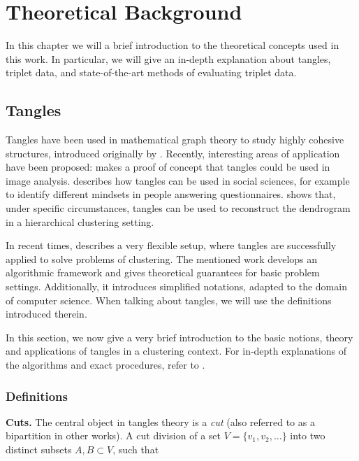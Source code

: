 \chapter{Theoretical Background}\label{theory}
In this chapter we will a brief introduction to the theoretical concepts used in this work. 
In particular, we will give an in-depth explanation about tangles, triplet data, and state-of-the-art methods of evaluating triplet data.

\section{Tangles}\label{theory:tangles}
Tangles have been used in mathematical graph theory to study highly cohesive structures, 
introduced originally by \cite{robertsonGraphMinorsObstructions1991}. 
Recently, interesting areas of application have been proposed:
\cite{diestelTanglesMonaLisa2017} makes a proof of concept that tangles could 
be used in image analysis.
\cite{diestelTanglesSocialSciences2019} describes how tangles can be used in social sciences, for 
example to identify different mindsets in people answering questionnaires.
\citep{fluckTanglesSingleLinkage2019} shows that, under specific circumstances, tangles can be
used to reconstruct the dendrogram in a hierarchical clustering setting. 

In recent times, \cite{klepperClusteringTanglesAlgorithmic2021} describes a very flexible setup,
where tangles are successfully applied to solve problems of clustering. 
The mentioned work develops an algorithmic framework and gives theoretical guarantees for 
basic problem settings.
Additionally, it introduces simplified notations, adapted to the domain of computer science. 
When talking about tangles, we will use the definitions introduced therein. 

In this section, we now give a very brief introduction to the basic notions, theory and applications of tangles in a clustering context.
For in-depth explanations of the algorithms and exact procedures, refer to 
\cite{klepperClusteringTanglesAlgorithmic2021}.


\subsection{Definitions}
\textbf{Cuts.} The central object in tangles theory is a \textit{cut} (also referred to as a bipartition in other works). 
A cut division of a set $V =  \{ v_1, v_2, \ldots \}$ into two distinct subsets $A, B \subset V$, such that

